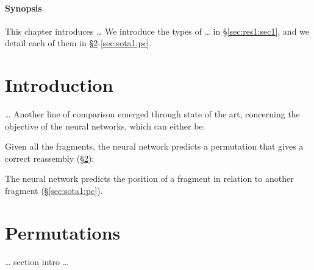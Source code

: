 
\paragraph{Synopsis}
This chapter introduces … We introduce the types of … in §\ref{sec:res1:sec1}, and we detail each of them in §\ref{sec:sota1:perm}-\ref{sec:sota1:pc}.


\section{Introduction}
\label{sec:sota1:introduction}

… Another line of comparison emerged through state of the art, concerning the objective of the neural networks, which can either be:
\begin{description}
    \setlength\itemsep{0em}
    \item [Permutation:] Given all the fragments, the neural network predicts a permutation that gives a correct reassembly (§\ref{sec:sota1:perm});
    \item [Pairwise comparison:] The neural network predicts the position of a fragment in relation to another fragment (§\ref{sec:sota1:pc}).
\end{description}


\section{Permutations}
\label{sec:sota1:perm}

… section intro …

